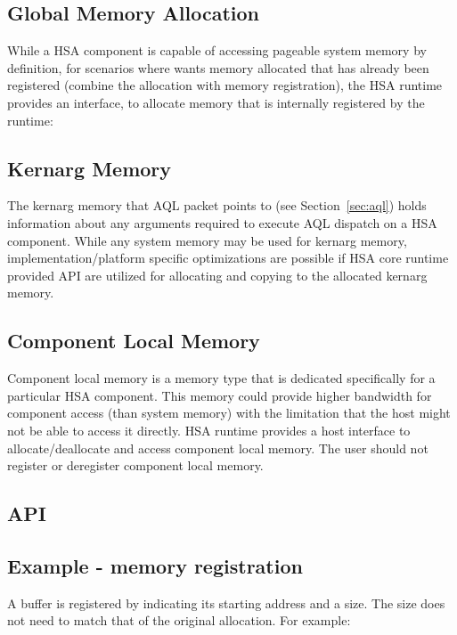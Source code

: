 \documentclass[final]{book}
\begin{document}
\subsection{Global  Memory Allocation}\label{globalmemory}

While a HSA component is capable of accessing pageable system memory by
definition, for scenarios where wants memory allocated that has already been
registered (combine the allocation with memory registration), the HSA runtime
provides an interface,  to allocate memory that is
internally registered by the runtime:


\hypertarget{kernarg}{}\subsection{Kernarg Memory}\label{kernargmem}

The kernarg memory that AQL packet points to (see Section~\ref{sec:aql}) holds
information about any arguments required to execute AQL dispatch on a HSA
component. While any system memory may be used for kernarg memory,
implementation/platform specific optimizations are possible if HSA core runtime
provided API are utilized for allocating and copying to the allocated kernarg
memory.

\hypertarget{device-memory}{}\subsection{Component Local Memory}
\label{device-memory}

Component local memory is a memory type that is dedicated specifically for a
particular HSA component. This memory could provide higher bandwidth for
component access (than system memory) with the limitation that the host might
not be able to access it directly. HSA runtime provides a host interface to
allocate/deallocate and access component local memory. The user should not
register or deregister component local memory.

\subsection{API}


\subsection{Example - memory registration}

A buffer is registered by indicating its starting address and a size. The size
does not need to match that of the original allocation. For example:
\end{document}
